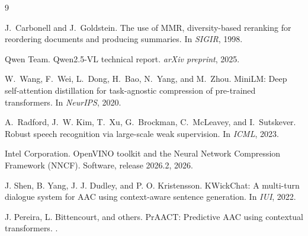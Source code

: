 \documentclass{article}
\begin{document}
\begin{thebibliography}{9}

J.~Carbonell and J.~Goldstein.
\newblock The use of MMR, diversity-based reranking for reordering documents and
producing summaries.
\newblock In \emph{SIGIR}, 1998.

Qwen Team.
\newblock Qwen2.5-VL technical report.
\newblock \emph{arXiv preprint}, 2025.

W.~Wang, F.~Wei, L.~Dong, H.~Bao, N.~Yang, and M.~Zhou.
\newblock MiniLM: Deep self-attention distillation for task-agnostic compression
of pre-trained transformers.
\newblock In \emph{NeurIPS}, 2020.

A.~Radford, J.~W. Kim, T.~Xu, G.~Brockman, C.~McLeavey, and I.~Sutskever.
\newblock Robust speech recognition via large-scale weak supervision.
\newblock In \emph{ICML}, 2023.

Intel Corporation.
\newblock OpenVINO toolkit and the Neural Network Compression Framework (NNCF).
\newblock Software, release 2026.2, 2026.

J. Shen, B. Yang, J. J. Dudley, and P. O. Kristensson.
\newblock KWickChat: A multi-turn dialogue system for AAC using context-aware
sentence generation.
\newblock In \emph{IUI}, 2022.

J. Pereira, L. Bittencourt, and others.
\newblock PrAACT: Predictive AAC using contextual transformers.
.

\end{thebibliography}

\appendix
\end{document}

